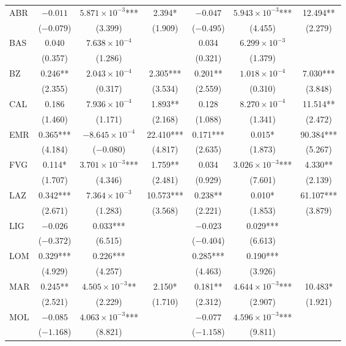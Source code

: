 \documentclass[12pt]{article}
\begin{document}
\begin{longtable}{@{}lcccccc@{}}
        ABR & $-0.011$ & $5.871 \times 10^{-3}$*** & 2.394* & $-0.047$ & $5.943 \times 10^{-3}$*** & 12.494** \\
         & ($-0.079$) & (3.399) & (1.909) & ($-0.495$) & (4.455) & (2.279) \\ 
        BAS & 0.040 & $7.638 \times 10^{-4}$ &  & 0.034 & $6.299 \times 10^{-3}$ &  \\ 
         & (0.357) & (1.286) &  & (0.321) & (1.379) &  \\ 
        BZ & 0.246** & $2.043 \times 10^{-4}$ & 2.305*** & 0.201** & $1.018 \times 10^{-4}$ & 7.030*** \\ 
         & (2.355) & (0.317) & (3.534) & (2.559) & (0.310) & (3.848) \\ 
        CAL & 0.186 & $7.936 \times 10^{-4}$ & 1.893** & 0.128 & $8.270 \times 10^{-4}$ & 11.514** \\ 
         & (1.460) & (1.171) & (2.168) & (1.088) & (1.341) & (2.472) \\ 
        EMR & 0.365*** & $-8.645 \times 10^{-4}$ & 22.410*** & 0.171*** & 0.015* & 90.384*** \\ 
         & (4.184) & ($-0.080$) & (4.817) & (2.635) & (1.873) & (5.267) \\ 
        FVG & 0.114* & $3.701 \times 10^{-3}$*** & 1.759** & 0.034 & $3.026 \times 10^{-3}$*** & 4.330** \\ 
         & (1.707) & (4.346) & (2.481) & (0.929) & (7.601) & (2.139) \\ 
        LAZ & 0.342*** & $7.364 \times 10^{-3}$ & 10.573*** & 0.238** & 0.010* & 61.107*** \\ 
         & (2.671) & (1.283) & (3.568) & (2.221) & (1.853) & (3.879) \\ 
        LIG & $-0.026$ & 0.033*** &  & $-0.023$ & 0.029*** &  \\ 
         & ($-0.372$) & (6.515) &  & ($-0.404$) & (6.613) &  \\ 
        LOM & 0.329*** & 0.226*** &  & 0.285*** & 0.190*** &  \\ 
         & (4.929) & (4.257) &  & (4.463) & (3.926) &  \\ 
        MAR & 0.245** & $4.505 \times 10^{-3}$** & 2.150* & 0.181** & $4.644 \times 10^{-3}$*** & 10.483* \\ 
         & (2.521) & (2.229) & (1.710) & (2.312) & (2.907) & (1.921) \\ 
        MOL & $-0.085$ & $4.063 \times 10^{-3}$*** &  & $-0.077$ & $4.596 \times 10^{-3}$*** &  \\ 
         & ($-1.168$) & (8.821) &  & ($-1.158$) & (9.811) &  \\ 

\end{longtable}
\end{document}
